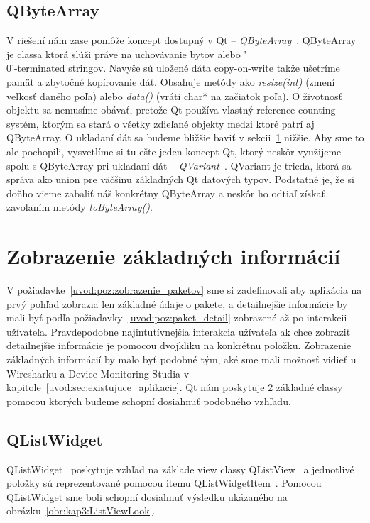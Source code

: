 \subsection*{QByteArray}
\label{kap03:sec:uch_dat:qbytearray}
V riešení nám zase pomôže koncept dostupný v Qt -- \textit{QByteArray}~\cite{qbytearray}. QByteArray je classa ktorá slúži práve na uchovávanie bytov alebo '\\0'-terminated stringov. Navyše sú uložené dáta copy-on-write takže ušetríme pamäť a zbytočné kopírovanie dát. Obsahuje metódy ako \textit{resize(int)} (zmení veľkosť daného poľa) alebo \textit{data()} (vráti char* na začiatok poľa). O životnosť objektu sa nemusíme obávať, pretože Qt používa vlastný reference counting systém, ktorým sa stará o všetky zdieľané objekty medzi ktoré patrí aj QByteArray. O ukladaní dát sa budeme bližšie baviť v sekcii~\ref{kap03:sec:zobr_zakl} nižšie. Aby sme to ale pochopili, vysvetlíme si tu ešte jeden koncept Qt, ktorý neskôr využijeme spolu s QByteArray pri ukladaní dát -- \textit{QVariant}~\cite{qvariant}. QVariant je trieda, ktorá sa správa ako union pre väčšinu základných Qt datových typov. Podstatné je, že si doňho vieme zabaliť náš konkrétny QByteArray a neskôr ho odtiaľ získať zavolaním metódy \textit{toByteArray()}.

\section{Zobrazenie základných informácií}
\label{kap03:sec:zobr_zakl}
V požiadavke~\ref{uvod:poz:zobrazenie_paketov} sme si zadefinovali aby aplikácia na prvý pohľad zobrazia len základné údaje o pakete, a detailnejšie informácie by mali byť podľa požiadavky~\ref{uvod:poz:paket_detail} zobrazené až po interakcii užívateľa. Pravdepodobne najintutívnejšia interakcia užívateľa ak chce zobraziť detailnejšie informácie je pomocou dvojkliku na konkrétnu položku. Zobrazenie základných informácií by malo byť podobné tým, aké sme mali možnosť vidieť u Wiresharku a Device Monitoring Studia v kapitole~\ref{uvod:sec:existujuce_aplikacie}. Qt nám poskytuje 2 základné classy pomocou ktorých budeme schopní dosiahnuť podobného vzhľadu.

\subsection{QListWidget}
QListWidget~\cite{qlistwidget} poskytuje vzhľad na základe view classy QListView~\cite{qlistview} a jednotlivé položky sú reprezentované pomocou itemu QListWidgetItem~\cite{qlistwidgetitem}. Pomocou QListWidget sme boli schopní dosiahnuť výsledku ukázaného na obrázku~\ref{obr:kap3:ListViewLook}.


